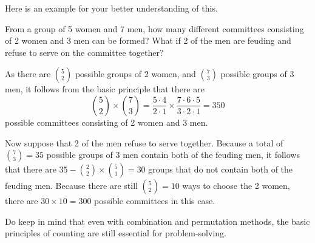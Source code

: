        Here is an example  for your better understanding of this.
        \begin{example}
            From a group of 5 women and 7 men, how many different committees consisting of 2 women and 3 men can be formed? What if 2 of the men are feuding and refuse to serve on the committee together?
            \end{example}
            
            \begin{solution}
            As there are \( \binom{5}{2} \) possible groups of 2 women, and \( \binom{7}{3} \) possible groups of 3 men, it follows from the basic principle that there are 
            \[ \binom{5}{2} \times \binom{7}{3} = \frac{5 \cdot 4}{2 \cdot 1} \times \frac{7 \cdot 6 \cdot 5}{3 \cdot 2 \cdot 1} = 350 \]
            possible committees consisting of 2 women and 3 men.
            
            Now suppose that 2 of the men refuse to serve together. Because a total of \( \binom{7}{3} = 35 \) possible groups of 3 men contain both of the feuding men, it follows that there are \( 35 - \binom{2}{2} \times \binom{5}{1} = 30 \) groups that do not contain both of the feuding men. Because there are still \( \binom{5}{2} = 10 \) ways to choose the 2 women, there are \( 30 \times 10 = 300 \) possible committees in this case.
        \end{solution}
        Do keep in mind that even with combination and permutation methods, the basic principles of counting are still essential for problem-solving.

